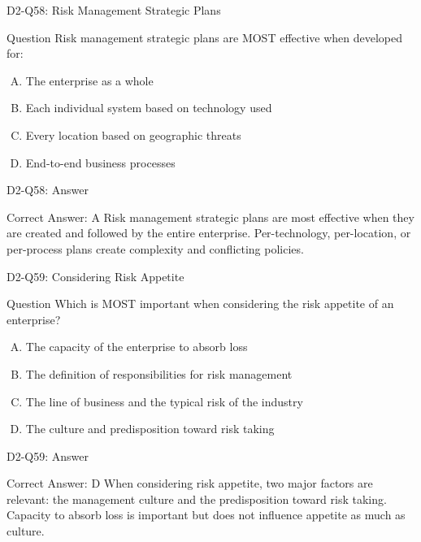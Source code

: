 \documentclass{beamer}
\begin{document}
	\begin{frame}{D2-Q58: Risk Management Strategic Plans}
		\begin{block}{Question}
			Risk management strategic plans are MOST effective when developed for:
		\end{block}
		\begin{enumerate}[(A)]
			\item The enterprise as a whole
			\item Each individual system based on technology used
			\item Every location based on geographic threats
			\item End-to-end business processes
		\end{enumerate}
	\end{frame}
	\begin{frame}{D2-Q58: Answer}
		\begin{block}{Correct Answer: A}
			Risk management strategic plans are most effective when they are created and followed by the entire enterprise. Per-technology, per-location, or per-process plans create complexity and conflicting policies.
		\end{block}
	\end{frame}
	
	\begin{frame}{D2-Q59: Considering Risk Appetite}
		\begin{block}{Question}
			Which is MOST important when considering the risk appetite of an enterprise?
		\end{block}
		\begin{enumerate}[(A)]
			\item The capacity of the enterprise to absorb loss
			\item The definition of responsibilities for risk management
			\item The line of business and the typical risk of the industry
			\item The culture and predisposition toward risk taking
		\end{enumerate}
	\end{frame}
	\begin{frame}{D2-Q59: Answer}
		\begin{block}{Correct Answer: D}
			When considering risk appetite, two major factors are relevant: the management culture and the predisposition toward risk taking. Capacity to absorb loss is important but does not influence appetite as much as culture.
		\end{block}
	\end{frame}
	
\end{document}

